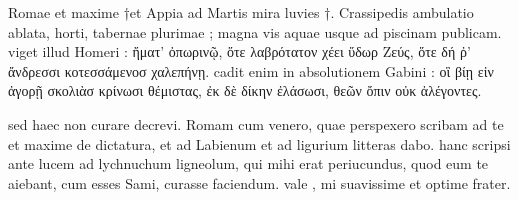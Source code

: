 


 Romae et maxime †et Appia ad Martis mira luvies †. Crassipedis ambulatio ablata, horti, tabernae plurimae ; magna vis aquae usque ad piscinam publicam. viget illud Homeri : ἤματ' ὀπωρινῷ, ὅτε λαβρότατον χέει ὕδωρ Ζεύς, ὅτε δή ῤ' ἄνδρεσσι κοτεσσάμενοσ χαλεπήνῃ. cadit enim in absolutionem Gabini : οἳ βίῃ εἰν ἀγορῇ σκολιὰσ κρίνωσι θέμιστας, ἐκ δὲ δίκην ἐλάσωσι, θεῶν ὄπιν οὐκ ἀλέγοντες.

 sed haec non curare decrevi. Romam cum venero, quae perspexero scribam ad te et maxime de dictatura, et ad Labienum et ad ligurium litteras dabo. hanc scripsi ante lucem ad lychnuchum ligneolum, qui mihi erat periucundus, quod eum te aiebant, cum esses Sami, curasse faciendum. vale , mi suavissime et optime frater.
